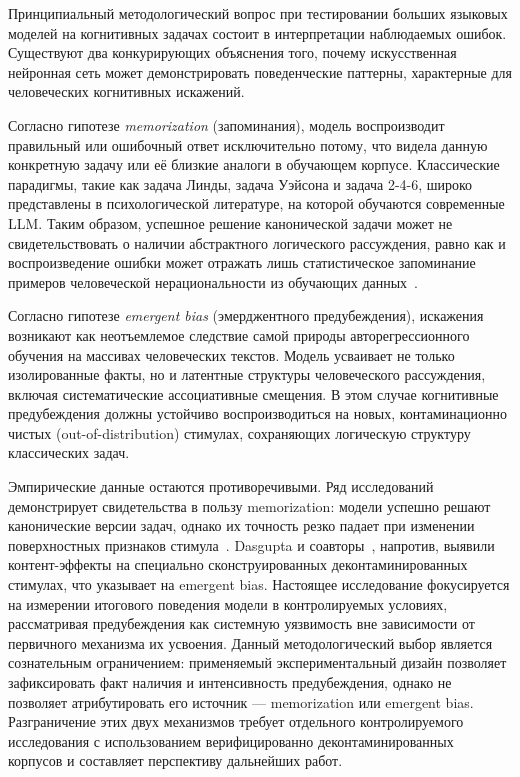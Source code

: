 Принципиальный методологический вопрос при тестировании больших языковых моделей на когнитивных задачах состоит в интерпретации наблюдаемых ошибок. Существуют два конкурирующих объяснения того, почему искусственная нейронная сеть может демонстрировать поведенческие паттерны, характерные для человеческих когнитивных искажений.

Согласно гипотезе \textit{memorization} (запоминания), модель воспроизводит правильный или ошибочный ответ исключительно потому, что видела данную конкретную задачу или её близкие аналоги в обучающем корпусе. Классические парадигмы, такие как задача Линды, задача Уэйсона и задача 2-4-6, широко представлены в психологической литературе, на которой обучаются современные LLM. Таким образом, успешное решение канонической задачи может не свидетельствовать о наличии абстрактного логического рассуждения, равно как и воспроизведение ошибки может отражать лишь статистическое запоминание примеров человеческой нерациональности из обучающих данных~\cite{zhou2023benchmark}.

Согласно гипотезе \textit{emergent bias} (эмерджентного предубеждения), искажения возникают как неотъемлемое следствие самой природы авторегрессионного обучения на массивах человеческих текстов. Модель усваивает не только изолированные факты, но и латентные структуры человеческого рассуждения, включая систематические ассоциативные смещения. В этом случае когнитивные предубеждения должны устойчиво воспроизводиться на новых, контаминационно чистых (out-of-distribution) стимулах, сохраняющих логическую структуру классических задач.

Эмпирические данные остаются противоречивыми. Ряд исследований демонстрирует свидетельства в пользу memorization: модели успешно решают канонические версии задач, однако их точность резко падает при изменении поверхностных признаков стимула~\cite{zhou2023benchmark, macmillan2024irrationality}. Dasgupta и соавторы~\cite{dasgupta2024language}, напротив, выявили контент-эффекты на специально сконструированных деконтаминированных стимулах, что указывает на emergent bias. Настоящее исследование фокусируется на измерении итогового поведения модели в контролируемых условиях, рассматривая предубеждения как системную уязвимость вне зависимости от первичного механизма их усвоения. Данный методологический выбор является сознательным ограничением: применяемый экспериментальный дизайн позволяет зафиксировать факт наличия и интенсивность предубеждения, однако не позволяет атрибутировать его источник --- memorization или emergent bias. Разграничение этих двух механизмов требует отдельного контролируемого исследования с использованием верифицированно деконтаминированных корпусов и составляет перспективу дальнейших работ.

